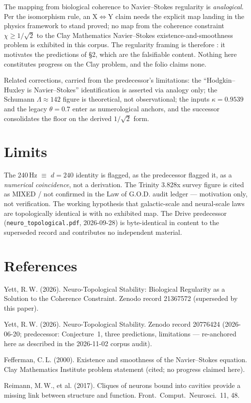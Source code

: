 \documentclass{alienfolio}
\begin{document}
The mapping from biological coherence to Navier--Stokes regularity is
\emph{analogical}. Per the isomorphism rule, an X$\iff$Y claim needs the
explicit map landing in the physics framework to stand proved; no map from
the coherence constraint $\chi \geq 1/\sqrt{2}$ to the Clay Mathematics
Navier--Stokes existence-and-smoothness problem is exhibited in this corpus.
The regularity framing is therefore : it
motivates the predictions of \S2, which are the falsifiable content. Nothing
here constitutes progress on the Clay problem, and the folio claims none.

Related corrections, carried from the predecessor's limitations: the
``Hodgkin--Huxley is Navier--Stokes'' identification is asserted via analogy
only; the Schumann $\Lambda \approx 142$ figure is theoretical, not
observational; the inputs $\kappa = 0.9539$ and the legacy $\theta = 0.7$
enter as numerological anchors, and the successor consolidates the floor on
the derived $1/\sqrt{2}$ form.

\section{Limits}
The 240\,Hz $\equiv$ $d = 240$ identity is flagged, as the predecessor
flagged it, as a \emph{numerical coincidence}, not a derivation. The Trinity
3.828x survey figure is cited as MIXED / not confirmed in the Law of G.O.D.
audit ledger --- motivation only, not verification. The working hypothesis
that galactic-scale and neural-scale laws are topologically identical is
 with no exhibited map. The Drive predecessor
(\texttt{neuro\_topological.pdf}, 2026-09-28) is byte-identical in content to
the superseded record and contributes no independent material.

\section*{References}
Yett, R.\,W. (2026). Neuro-Topological Stability: Biological Regularity as a
Solution to the Coherence Constraint. Zenodo record 21367572 (superseded by
this paper).

Yett, R.\,W. (2026). Neuro-Topological Stability. Zenodo record 20776424
(2026-06-20; predecessor: Conjecture~1, three predictions, limitations ---
re-anchored here as described in the 2026-11-02 corpus audit).

Fefferman, C.\,L. (2000). Existence and smoothness of the Navier--Stokes
equation. Clay Mathematics Institute problem statement (cited; no progress
claimed here).

Reimann, M.\,W., et al. (2017). Cliques of neurons bound into cavities
provide a missing link between structure and function. Front.\ Comput.\
Neurosci.\ 11, 48.
\end{document}
